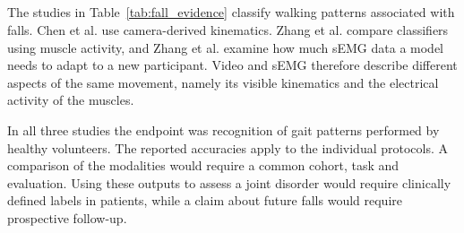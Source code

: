 \documentclass[12pt,nopreprintline]{elsarticle}
\begin{document}
\subsection{}
\label{sec:fall_related}
\begin{revision}
The studies in Table~\ref{tab:fall_evidence} classify walking patterns associated with falls. Chen et al. \cite{chen2022computer} use camera-derived kinematics. Zhang et al. \cite{zhang2025myoelectric} compare classifiers using muscle activity, and Zhang et al. \cite{zhang2024fall} examine how much sEMG data a model needs to adapt to a new participant. Video and sEMG therefore describe different aspects of the same movement, namely its visible kinematics and the electrical activity of the muscles.

In all three studies the endpoint was recognition of gait patterns performed by healthy volunteers. The reported accuracies apply to the individual protocols. A comparison of the modalities would require a common cohort, task and evaluation. Using these outputs to assess a joint disorder would require clinically defined labels in patients, while a claim about future falls would require prospective follow-up.
\end{revision}
\end{document}
